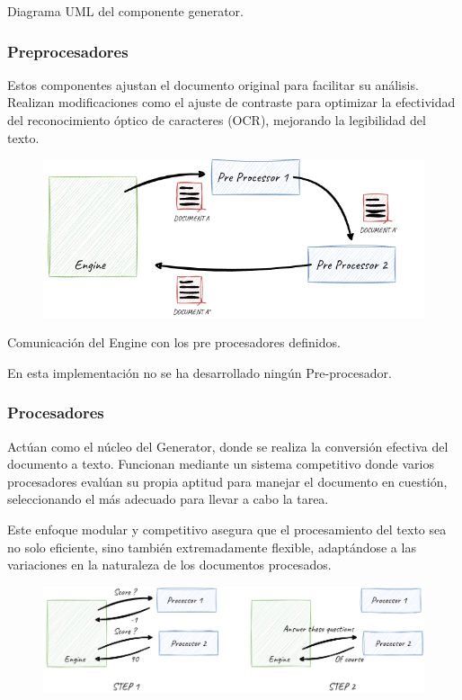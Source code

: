 Diagrama UML del componente generator.

\subsubsection*{Preprocesadores}
Estos componentes ajustan el documento original para facilitar su análisis. Realizan modificaciones como el ajuste de contraste para optimizar la efectividad del reconocimiento óptico de caracteres (OCR), mejorando la legibilidad del texto.

\begin{figure}
    \centering
    \includegraphics{./chapter/4/images/ad_4nxccemzz1bxsroksvslihdkre9_b2-yqr2hu4hmvwfblvicw_lzbshudm5upl70uk6mxjhlpzvaa8b79oba_npzrpimoggwd}
    \caption{}
    \label{fig:ad_4nxccemzz1bxsroksvslihdkre9_b2-yqr2hu4hmvwfblvicw_lzbshudm5upl70uk6mxjhlpzvaa8b79oba_npzrpimoggwd}
\end{figure}

Comunicación del Engine con los pre procesadores definidos.

En esta implementación no se ha desarrollado ningún Pre-procesador.

\subsubsection*{Procesadores}
Actúan como el núcleo del Generator, donde se realiza la conversión efectiva del documento a texto. Funcionan mediante un sistema competitivo donde varios procesadores evalúan su propia aptitud para manejar el documento en cuestión, seleccionando el más adecuado para llevar a cabo la tarea.

Este enfoque modular y competitivo asegura que el procesamiento del texto sea no solo eficiente, sino también extremadamente flexible, adaptándose a las variaciones en la naturaleza de los documentos procesados.

\begin{figure}
    \centering
    \includegraphics{./chapter/4/images/ad_4nxflatsoejeb4h5hddo8a4otwjmcaznrikw1gvyzmtafloyas7kuglrhwlolub-qvwzl1ckw6ugltisracet07luw4uskwmx}
    \caption{}
    \label{fig:ad_4nxflatsoejeb4h5hddo8a4otwjmcaznrikw1gvyzmtafloyas7kuglrhwlolub-qvwzl1ckw6ugltisracet07luw4uskwmx}
\end{figure}

